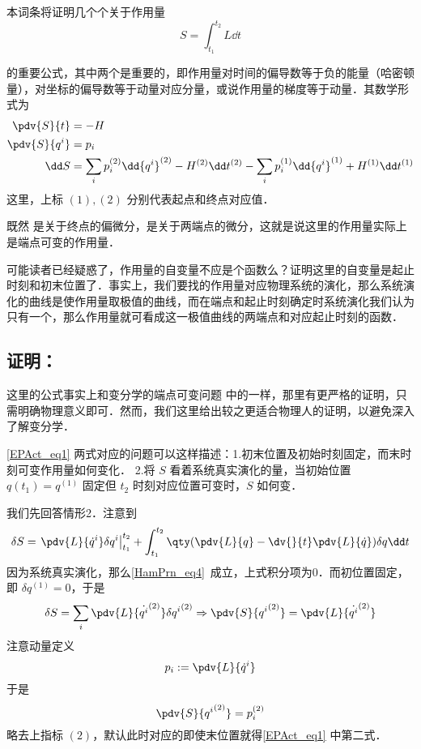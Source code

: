 本词条将证明几个个关于作用量
\begin{equation}
S=\int_{t_1}^{t_2}L\dd t
\end{equation}

的重要公式，其中两个是重要的，即作用量对时间的偏导数等于负的能量（哈密顿量），对坐标的偏导数等于动量对应分量，或说作用量的梯度等于动量．其数学形式为
\begin{equation}\label{EPAct_eq1}
\begin{aligned}
\pdv{S}{t}&=-H\\
\pdv{S}{q^i}&=p_i\\
\dd S&=\sum_i p_i^{(2)}\dd {q^i}^{(2)}-H^{(2)}\dd t^{(2)}-\sum_i p_i^{(1)}\dd {q^i}^{(1)}+H^{(1)}\dd t^{(1)}
\end{aligned}
\end{equation}
这里，上标 $(1),(2)$ 分别代表起点和终点对应值．

既然 是关于终点的偏微分，是关于两端点的微分，这就是说这里的作用量实际上是端点可变的作用量．

可能读者已经疑惑了，作用量的自变量不应是个函数么？证明这里的自变量是起止时刻和初末位置了．事实上，我们要找的作用量对应物理系统的演化，那么系统演化的曲线是使作用量取极值的曲线，而在端点和起止时刻确定时系统演化我们认为只有一个，那么作用量就可看成这一极值曲线的两端点和对应起止时刻的函数．
\subsection{证明：}
这里的公式事实上和变分学的端点可变问题 中的一样，那里有更严格的证明，只需明确物理意义即可．然而，我们这里给出较之更适合物理人的证明，以避免深入了解变分学．

\autoref{EPAct_eq1} 两式对应的问题可以这样描述：1.初末位置及初始时刻固定，而末时刻可变作用量如何变化．
2.将 $S$ 看着系统真实演化的量，当初始位置 $q(t_1)=q^{(1)}$ 固定但 $t_2$ 时刻对应位置可变时，$S$ 如何变．

我们先回答情形2．注意到
\begin{equation}
\delta S=\left.\pdv{L}{\dot q^i}\delta q^i\right|_{t_1}^{t_2}+\int_{t_1}^{t_2}\qty(\pdv{L}{q}-\dv{}{t}\pdv{L}{\dot q})\delta q\dd t
\end{equation}
因为系统真实演化，那么\autoref{HamPrn_eq4}~成立，上式积分项为0．而初位置固定，即 $\delta q^{(1)}=0$，于是
\begin{equation}
\delta S=\sum_i\pdv{L}{\dot {q^i}^{(2)}}\delta {q^i}^{(2)}\Rightarrow \pdv{S}{{q^i}^{(2)}}=\pdv{L}{\dot {q^i}^{(2)}}
\end{equation}
注意动量定义
\begin{equation}
p_i:=\pdv{L}{\dot q^i}
\end{equation}
于是
\begin{equation}
\pdv{S}{{q^i}^{(2)}}=p_i^{(2)}
\end{equation}
略去上指标 $(2)$，默认此时对应的即使末位置就得\autoref{EPAct_eq1} 中第二式．

